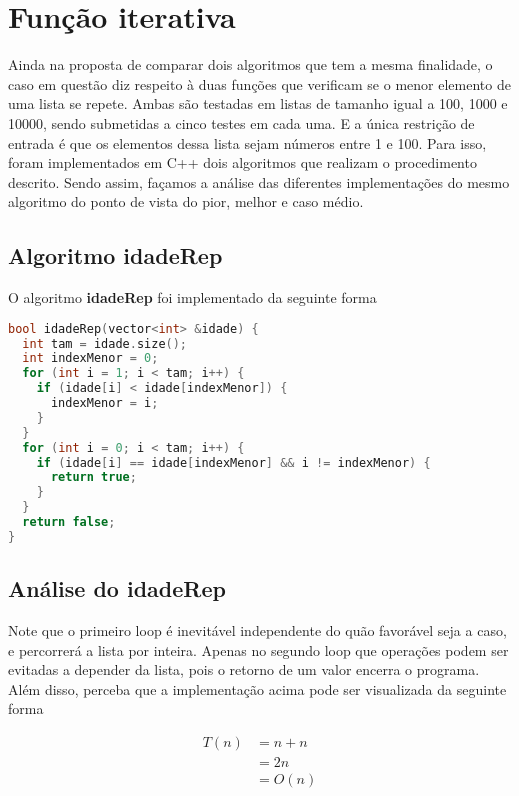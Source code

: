 \section{Função iterativa}
\label{sec:func-it}

Ainda na proposta de comparar dois algoritmos que tem a mesma finalidade, o caso em questão diz respeito à duas funções que verificam se o menor elemento de uma lista se repete. Ambas são testadas em listas de tamanho igual a 100, 1000 e 10000, sendo submetidas a cinco testes em cada uma. E a única restrição de entrada é que os elementos dessa lista sejam números entre 1 e 100. Para isso, foram implementados em C++ dois algoritmos que realizam o procedimento descrito. Sendo assim, façamos a análise das diferentes implementações do mesmo algoritmo do ponto de vista do pior, melhor e caso médio.

\subsection{Algoritmo idadeRep}

O algoritmo \textbf{idadeRep} foi implementado da seguinte forma

\begin{lstlisting}[language=C++]
bool idadeRep(vector<int> &idade) {
  int tam = idade.size();
  int indexMenor = 0;
  for (int i = 1; i < tam; i++) {
    if (idade[i] < idade[indexMenor]) {
      indexMenor = i;
    }
  }
  for (int i = 0; i < tam; i++) {
    if (idade[i] == idade[indexMenor] && i != indexMenor) {
      return true;
    }
  }
  return false;
}
\end{lstlisting}

\subsection{Análise do idadeRep}

Note que o primeiro loop é inevitável independente do quão favorável seja a caso, e percorrerá a lista por inteira. Apenas no segundo loop que operações podem ser evitadas a depender da lista, pois o retorno de um valor encerra o programa. Além disso, perceba que a implementação acima pode ser visualizada da seguinte forma

\begin{align*}
  T(n) & = n + n\\ 
       & = 2n \\
       & = O(n)
\end{align*}

